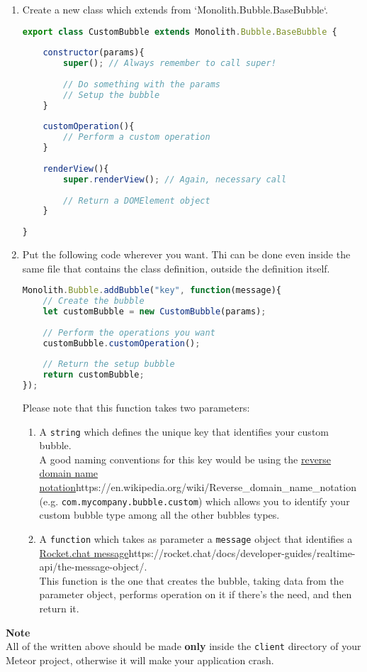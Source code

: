 \begin{enumerate}
	\item Create a new class which extends from `Monolith.Bubble.BaseBubble`.
\begin{lstlisting}[language=JavaScript]
export class CustomBubble extends Monolith.Bubble.BaseBubble {
    
    constructor(params){
        super(); // Always remember to call super!
        
        // Do something with the params
        // Setup the bubble
    }
    
    customOperation(){
        // Perform a custom operation
    }
    
    renderView(){
        super.renderView(); // Again, necessary call
        
        // Return a DOMElement object
    }
    
}
\end{lstlisting}

	\item Put the following code wherever you want. Thi can be done even inside the same file that contains the class definition, outside the definition itself.
\begin{lstlisting}[language=JavaScript]
Monolith.Bubble.addBubble("key", function(message){
    // Create the bubble
    let customBubble = new CustomBubble(params);
    
    // Perform the operations you want
    customBubble.customOperation();
    
    // Return the setup bubble
    return customBubble;
});
\end{lstlisting}
Please note that this function takes two parameters:
	\begin{enumerate}
		\item A \texttt{string} which defines the unique key that identifies your custom bubble.   \\
   		A good naming conventions for this key would be using the \url{reverse domain name notation}{https://en.wikipedia.org/wiki/Reverse_domain_name_notation} (e.g. \texttt{com.mycompany.bubble.custom}) which allows you to identify your custom bubble type among all the other bubbles types.
		\item A \texttt{function} which takes as parameter a \texttt{message} object that identifies a \url{Rocket.chat message}{https://rocket.chat/docs/developer-guides/realtime-api/the-message-object/}.  \\
   This function is the one that creates the bubble, taking data from the parameter object, performs operation on it if there's the need, and then return it.
   \end{enumerate}
\end{enumerate}   
   
\textbf{Note} \\
All of the written above should be made \textbf{only} inside the \texttt{client} directory of your Meteor project, otherwise it will make your application crash.

\newpage